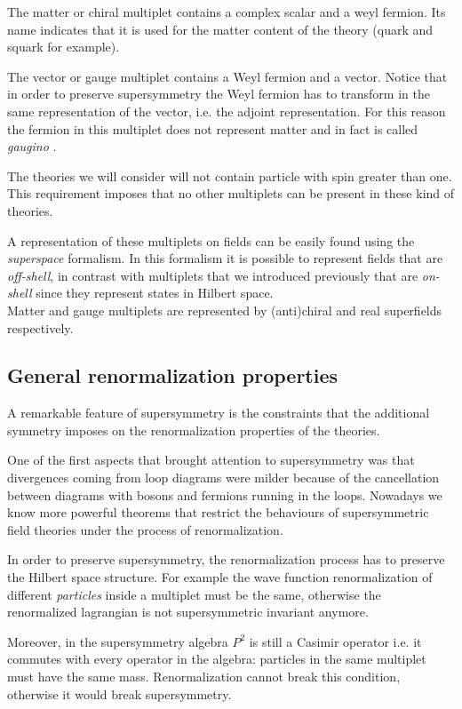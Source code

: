 The matter or chiral multiplet contains a complex scalar and a weyl fermion. Its name indicates that it is used for the matter content of the theory (quark and squark for example).

The vector or gauge multiplet contains a Weyl fermion and a vector. 
Notice that in order to preserve supersymmetry the Weyl fermion has to transform in the same representation of the vector, i.e. the adjoint representation.
For this reason the fermion in this multiplet does not represent matter and in fact is called \emph{gaugino} .

The theories we will consider will not contain particle with spin greater than one.
This requirement imposes that no other multiplets can be present in these kind of theories.

A representation of these multiplets on fields can be easily found using the \emph{superspace} formalism.
In this formalism it is possible to represent fields  that are \emph{off-shell}, in contrast with multiplets that we introduced previously that are \emph{on-shell} since they represent states in Hilbert space.\\
Matter and gauge multiplets are represented by (anti)chiral and real superfields respectively.



\subsection{ General renormalization properties}

A remarkable feature of supersymmetry is the constraints that the additional symmetry imposes on the renormalization properties of the theories.

One of the first aspects that brought attention to supersymmetry was that divergences coming from loop diagrams were milder because of the cancellation between diagrams with bosons and fermions running in the loops. 
Nowadays we know more powerful theorems that restrict the behaviours of supersymmetric field theories under the process of renormalization.

In order to preserve supersymmetry, the renormalization process has to preserve the Hilbert space structure. For example the wave function renormalization of different \emph{ particles} inside a multiplet must be the same, otherwise the renormalized lagrangian is not supersymmetric invariant anymore. 

Moreover, in the supersymmetry algebra $P^2$ is still a Casimir operator i.e. it commutes with every operator in the algebra: particles in the same multiplet must have the same mass.
Renormalization cannot break this condition, otherwise it would break supersymmetry.

